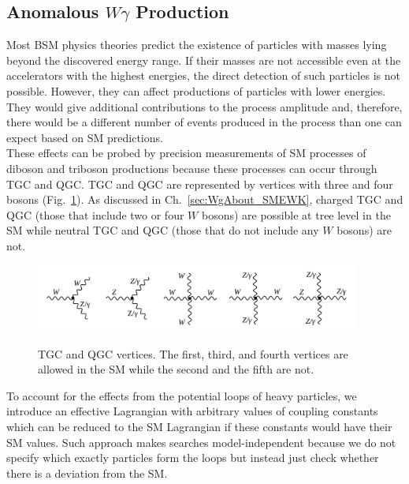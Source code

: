 \subsection{Anomalous $W\gamma$ Production}
\label{sec:WgAbout_ATGC}

Most BSM physics theories predict the existence of particles with masses lying beyond the discovered energy range. If their masses are not accessible even at the accelerators with the highest energies, the direct detection of such particles is not possible. However, they can affect productions of particles with lower energies. They would give additional contributions to the process amplitude and, therefore, there would be a different number of events produced in the process than one can expect based on SM predictions.\\

These effects can be probed by precision measurements of SM processes of diboson and triboson productions because these processes can occur through TGC and QGC. TGC and QGC are represented by vertices with three and four bosons (Fig.~\ref{fig:TGC_and_QGC_vertices}). As discussed in Ch.~\ref{sec:WgAbout_SMEWK}, charged TGC and QGC (those that include two or four $W$ bosons) are possible at tree level in the SM while neutral TGC and QGC (those that do not include any $W$ bosons) are not.\\ 

\begin{figure}[htb]
  \begin{center}
    {\includegraphics[width=0.95\textwidth]{../figs/WgAbout/TGC_and_QGC_vertices.png}}
    \caption{TGC and QGC vertices. The first, third, and fourth vertices are allowed in the SM while the second and the fifth are not.}
    \label{fig:TGC_and_QGC_vertices}
  \end{center}
\end{figure}

To account for the effects from the potential loops of heavy particles, we introduce an effective Lagrangian with arbitrary values of coupling constants which can be reduced to the SM Lagrangian if these constants would have their SM values. Such approach makes searches model-independent because we do not specify which exactly particles form the loops but instead just check whether there is a deviation from the SM. \\

